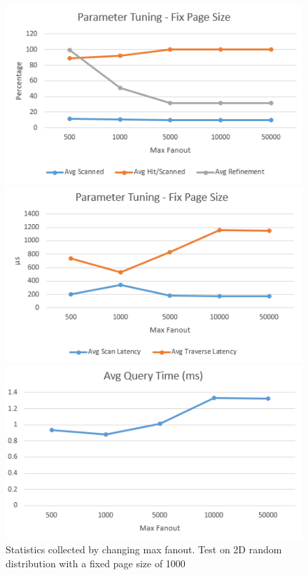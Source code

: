 \documentclass[sigconf,10pt]{acmart}
\begin{document}
\begin{figure}[ht] 
  \label{parameter-fix-pageSize} 
  \begin{minipage}[b]{0.33\linewidth}
    \centering
    \includegraphics[width=.8\linewidth]{../figures/parameter/fix-pagesize-hit} 
    \vspace{4ex}
  \end{minipage}%
  \begin{minipage}[b]{0.33\linewidth}
    \centering
    \includegraphics[width=.8\linewidth]{../figures/parameter/fix-pagesize-latency} 
    \vspace{4ex}
  \end{minipage}%
  \begin{minipage}[b]{0.33\linewidth}
    \centering
    \includegraphics[width=.8\linewidth]{../figures/parameter/fix-pagesize-qtime} 
    \vspace{4ex}
  \end{minipage}
  \caption{Statistics collected by changing max fanout. Test on 2D random distribution
  with a fixed page size of 1000}
\end{figure}
\end{document}
